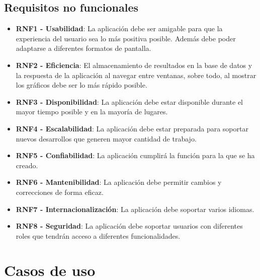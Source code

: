 \subsection{Requisitos no funcionales}
\begin{itemize}
	\item \textbf{RNF1 - Usabilidad}: La aplicación debe ser amigable para que la experiencia del usuario sea lo más positiva posible. Además debe poder adaptarse a diferentes formatos de pantalla. 
	\item \textbf{RNF2 - Eficiencia}: El almacenamiento de resultados en la base de datos y la respuesta de la aplicación al navegar entre ventanas, sobre todo, al mostrar los gráficos debe ser lo más rápido posible. 
	\item \textbf{RNF3 - Disponibilidad}: La aplicación debe estar disponible durante el mayor tiempo posible y en la mayoría de lugares. 
	\item \textbf{RNF4 - Escalabilidad}: La aplicación debe estar preparada para soportar nuevos desarrollos que generen mayor cantidad de trabajo. 
	\item \textbf{RNF5 - Confiabilidad}: La aplicación cumplirá la función para la que se ha creado. 
	\item \textbf{RNF6 - Mantenibilidad}: La aplicación debe permitir cambios y correcciones de forma eficaz.
	\item \textbf{RNF7 - Internacionalización}: La aplicación debe soportar varios idiomas.
	\item \textbf{RNF8 - Seguridad}: La aplicación debe soportar usuarios con diferentes roles que tendrán acceso a diferentes funcionalidades.
	
\end{itemize}


\section{Casos de uso}

